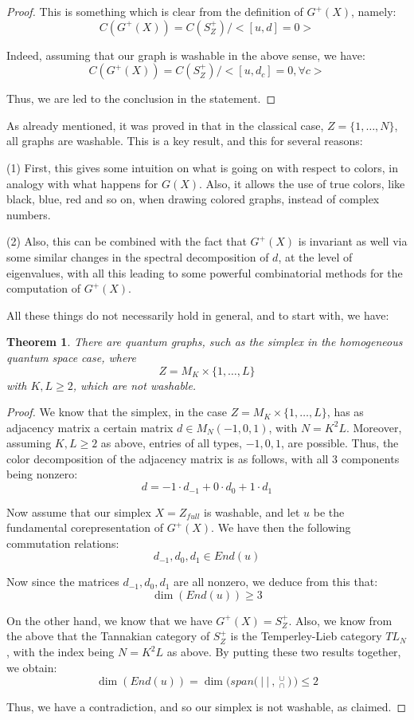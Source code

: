 \documentclass[12pt]{amsbook}
\newtheorem{theorem}{Theorem}[chapter]
\begin{document}
\begin{proof}
This is something which is clear from the definition of $G^+(X)$, namely:
$$C(G^+(X))=C(S_Z^+)\Big/\Big<[u,d]=0\Big>$$

Indeed, assuming that our graph is washable in the above sense, we have:
$$C(G^+(X))=C(S_Z^+)\Big/\Big<[u,d_c]=0,\forall c\Big>$$

Thus, we are led to the conclusion in the statement.
\end{proof}

As already mentioned, it was proved in \cite{ba2} that in the classical case, $Z=\{1,\ldots,N\}$, all graphs are washable. This is a key result, and this for several reasons: 

\medskip

(1) First, this gives some intuition on what is going on with respect to colors, in analogy with what happens for $G(X)$. Also, it allows the use of true colors, like black, blue, red and so on, when drawing colored graphs, instead of complex numbers.

\medskip

(2) Also, this can be combined with the fact that $G^+(X)$ is invariant as well via some similar changes in the spectral decomposition of $d$, at the level of eigenvalues, with all this leading to some powerful combinatorial methods for the computation of $G^+(X)$.

\medskip

All these things do not necessarily hold in general, and to start with, we have:

\begin{theorem}
There are quantum graphs, such as the simplex in the homogeneous quantum space case, where
$$Z=M_K\times\{1,\ldots,L\}$$
with $K,L\geq2$, which are not washable.
\end{theorem}

\begin{proof}
We know that the simplex, in the case $Z=M_K\times\{1,\ldots,L\}$, has as adjacency matrix a certain matrix $d\in M_N(-1,0,1)$, with $N=K^2L$. Moreover, assuming $K,L\geq2$ as above, entries of all types, $-1,0,1$, are possible. Thus, the color decomposition of the adjacency matrix is as follows, with all 3 components being nonzero:
$$d=-1\cdot d_{-1}+0\cdot d_0+1\cdot d_1$$

Now assume that our simplex $X=Z_{full}$ is washable, and let $u$ be the fundamental corepresentation of $G^+(X)$. We have then the following commutation relations:
$$d_{-1},d_0,d_1\in End(u)$$

Now since the matrices $d_{-1},d_0,d_1$ are all nonzero, we deduce from this that:
$$\dim(End(u))\geq3$$

On the other hand, we know that we have $G^+(X)=S_Z^+$. Also, we know from the above that the Tannakian category of $S_Z^+$ is the Temperley-Lieb category $TL_N$, with the index being $N=K^2L$ as above. By putting these two results together, we obtain:
$$\dim(End(u))=\dim\Big(span\Big(\ |\ |\ ,{\ }^\cup_\cap\ \Big)\,\Big)\leq2$$

Thus, we have a contradiction, and so our simplex is not washable, as claimed.
\end{proof}
\end{document}
